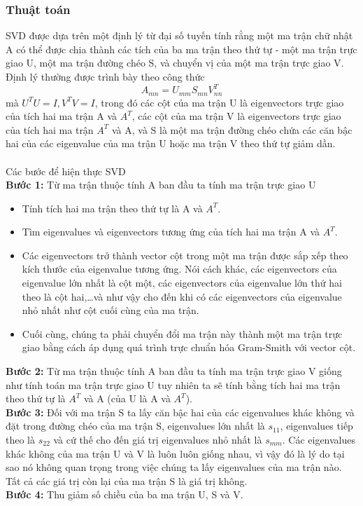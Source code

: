 \subsubsection{Thuật toán}
SVD được dựa trên một định lý từ đại số tuyến tính rằng một ma trận chữ nhật A
có thể được chia thành các tích của ba ma trận theo thứ tự - một ma trận trực
giao U, một ma trận đường chéo S, và chuyển vị của một ma trận trực giao V.
Định lý thường được trình bày theo công thức
\[ A_{mn} = U_{mm}S_{mn}V_{nn}^T \]
mà $U^TU = I, V^TV = I$, trong đó các cột của ma trận U là eigenvectors trực
giao của tích hai ma trận A và $A^T$, các cột của ma trận V là eigenvectors
trực giao của tích hai ma trận $A^T$ và A, và S là một ma trận đường chéo chứa
các căn bậc hai của các eigenvalue của ma trận U hoặc ma trận V theo thứ tự giảm dần.\\\\
Các bước để hiện thực SVD\\
\textbf{Bước 1:} Từ ma trận thuộc tính A ban đầu ta tính ma trận trực giao U
\begin{itemize}
  \item Tính tích hai ma trận theo thứ tự là A  và $A^T$.
  \item Tìm eigenvalues và eigenvectors tương ứng của tích hai ma trận A và
  $A^T$.
  \item Các eigenvectors trở thành vector cột trong một ma trận được sắp xếp
  theo kích thước của eigenvalue tương ứng. Nói cách khác, các eigenvectors của
  eigenvalue lớn nhất là cột một, các eigenvectors của eigenvalue lớn thứ hai
  theo là cột hai,\ldots và như vậy cho đến khi có các eigenvectors của
  eigenvalue nhỏ nhất như cột cuối cùng của ma trận.
  \item Cuối cùng, chúng ta phải chuyển đổi ma trận này thành một ma trận trực
  giao bằng cách áp dụng quá trình trực chuẩn hóa Gram-Smith với vector cột.
\end{itemize}
\textbf{Bước 2:} Từ ma trận thuộc tính A ban đầu ta tính ma trận trực giao V
giống như tính toán ma trận trực giao U tuy nhiên ta sẽ tính bằng tích hai ma
trận theo thứ tự là $A^T$ và A (của U là A và $A^T$).\\
\textbf{Bước 3:} Đối với ma trận S ta lấy căn bậc hai của các eigenvalues khác
không và đặt trong đường chéo của ma trận S, eigenvalues lớn nhất là $s_{11}$,
eigenvalues tiếp theo là $s_{22}$ và cứ thế cho đến giá trị eigenvalues nhỏ nhất
là $s_{mm}$. Các eigenvalues khác không của ma trận U và V là luôn luôn giống
nhau, vì vậy đó là lý do tại sao nó không quan trọng trong việc chúng ta lấy
eigenvalues của ma trận nào. Tất cả các giá trị còn lại của ma trận S là giá trị
không.\\
\textbf{Bước 4:} Thu giảm số chiều của ba ma trận U, S và V.
